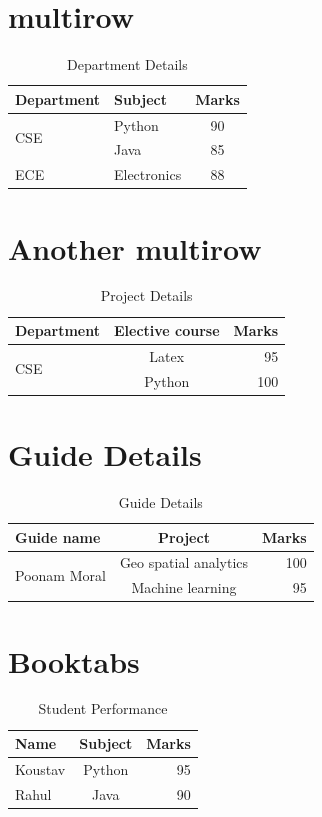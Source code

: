 \documentclass{article}
\begin{document}
	\section{multirow}
\begin{table}[h]
	\centering
	\caption{Department Details}
	
	\begin{tabular}{|l|l|c|}
		\hline
		Department & Subject & Marks \\
		\hline
		\multirow{2}{*}{CSE} & Python & 90 \\
		\cline{2-3}
		& Java & 85 \\
		\hline
		ECE & Electronics & 88 \\
		\hline
	\end{tabular}
\end{table}
\section{Another multirow}
	\begin{table}[h]
		\centering
		\caption{Project Details}
	\begin{tabular}{|l|c|r|}
		\hline
		Department & Elective course &Marks\\
		\hline
		\multirow{2}{*}{CSE} & Latex & 95\\
		\cline{2-3}
		&Python&100\\
		\hline
	\end{tabular}
	\end{table}
\section{Guide Details}
\begin{table}[h]
	\centering
	\caption{Guide Details}
	\vspace{0.35cm}
	\begin{tabular}{|l|c|r|}
		\hline
		Guide name & Project &Marks\\
		\hline
		\multirow{2}{*}{Poonam Moral}&Geo spatial analytics & 100\\
		\cline{2-3}
		&Machine learning &95\\
		\hline
		
	\end{tabular}
	
\end{table}
\section{Booktabs}
\begin{table}[h]
	\centering
	\caption{Student Performance}
	
	\begin{tabular}{lcr}
		\toprule
		Name & Subject & Marks \\
		\midrule
		Koustav & Python & 95 \\
		Rahul & Java & 90 \\
		\bottomrule
	\end{tabular}
	
\end{table}
\end{document}
